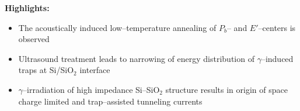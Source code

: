 \documentclass[preprint]{elsarticle}
\begin{document}
\textbf{Highlights:}

\begin{itemize}
  \item The acoustically induced low--temperature annealing of
      $P_b$-- and $E'$--centers is observed
  \item Ultrasound treatment leads to narrowing of energy distribution of $\gamma$--induced traps at Si/SiO$_2$  interface
  \item $\gamma$--irradiation of high impedance Si--SiO$_2$ structure results in origin of space charge limited and trap--assisted tunneling currents
\end{itemize}
\end{document}
